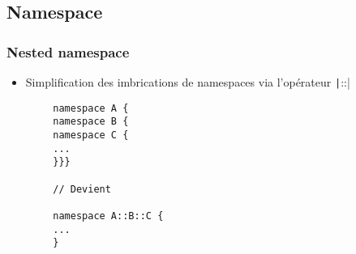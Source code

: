 \documentclass[C++.tex]{subfiles}
\begin{document}
\subsection*{Namespace}
\begin{frame}[fragile]
	\frametitle{Nested namespace}
	\begin{itemize}
		\item Simplification des imbrications de namespaces via l'opérateur \texttt|::|
	\end{itemize}

	\begin{verbatim}
		namespace A {
		namespace B {
		namespace C {
		...
		}}}

		// Devient

		namespace A::B::C {
		...
		}
	\end{verbatim}


\end{frame}
\end{document}
